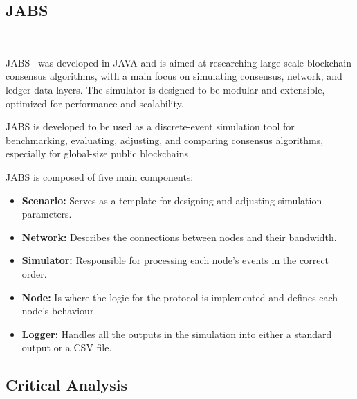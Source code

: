 \subsection{JABS}~\label{subsec:jabs}

JABS~\cite{jabs} was developed in JAVA and is aimed at researching large-scale blockchain consensus algorithms, with a main focus
on simulating consensus, network, and ledger-data layers. The simulator is designed to be
modular and extensible, optimized for performance and scalability.

JABS is developed to be used as a discrete-event simulation tool for benchmarking, evaluating, adjusting,
and comparing consensus algorithms, especially for global-size public blockchains

JABS is composed of five main components:

\begin{itemize}
  \item \textbf{Scenario:} Serves as a template for designing and adjusting simulation parameters.
  \item \textbf{Network:} Describes the connections between nodes and their bandwidth.
  \item \textbf{Simulator:} Responsible for processing each node's events in the correct order.
  \item \textbf{Node:} Is where the logic for the protocol is implemented and defines each node's
  behaviour.
  \item \textbf{Logger:} Handles all the outputs in the simulation into either a standard output or
  a CSV file.
\end{itemize}
\subsection{Critical Analysis}~\label{subsec:critical_analysis}

